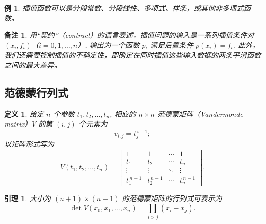 \documentclass[a4paper]{ctexart}
\newtheorem{remark}{备注}
\newtheorem{definition}[theorem]{定义} %
\newtheorem{lemma}[theorem]{引理}
\newtheorem{example}[theorem]{例}
\numberwithin{theorem}{section}
\numberwithin{equation}{section}
\numberwithin{figure}{section}
\numberwithin{remark}{section}
\begin{document}
\begin{example}
    插值函数可以是分段常数、分段线性、多项式、样条，或其他非多项式函数。    
\end{example}

\begin{remark}
用“契约”（contract）的语言表述，插值问题的输入是一系列插值条件对 $(x_i,f_i)$（$i=0,1,\dots,n$）, 输出为一个函数 $p$, 
满足后置条件 $p(x_i)=f_i$. 此外，我们还需要控制插值的不确定性，即确定在同时插值这些输入数据的两条平滑函数之间的最大差异。    
\end{remark}

\subsection{范德蒙行列式}

\begin{definition}
给定 $n$ 个参数 $t_1, t_2, \dots, t_n$, 相应的 $n\times n$ 范德蒙矩阵（Vandermonde matrix）$V$ 的第 $(i, j)$ 个元素为
\[
v_{i,j}=t_j^{\,i-1};
\]
以矩阵形式写为
\begin{equation}
    \label{eq::vandermonde}
V(t_1,t_2,\dots,t_n)=
\begin{bmatrix}
1 & 1 & \cdots & 1 \\
t_1 & t_2 & \cdots & t_n \\
\vdots & \vdots & \ddots & \vdots \\
t_1^{\,n-1} & t_2^{\,n-1} & \cdots & t_n^{\,n-1}
\end{bmatrix}.
\end{equation}
\end{definition}

\begin{lemma}
    \label{lem::vandermonde}
大小为 $(n+1)\times(n+1)$ 的范德蒙矩阵的行列式可表示为
\begin{equation}
    \label{eq::vandermonde_determinant}
\det V(x_0,x_1,\dots,x_n)=
\prod_{i>j}(x_i-x_j).
\end{equation}    
\end{lemma}
\end{document}
